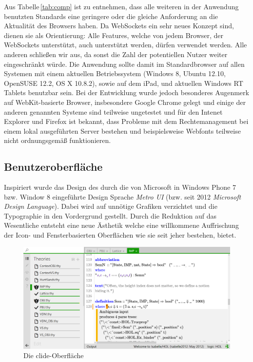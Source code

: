Aus Tabelle\,\ref{tab:comp} ist zu entnehmen, dass alle weiteren in der Anwendung benutzten
Standards eine geringere oder die gleiche Anforderung an die Aktualität des Browsers haben. Da
WebSockets ein sehr neues Konzept sind,  dienen sie als Orientierung: Alle Features, welche von
jedem Browser, der WebSockets unterstützt, auch unterstützt werden, dürfen verwendet werden. Alle
anderen schließen wir aus, da sonst die Zahl der potentiellen Nutzer weiter eingeschränkt würde. Die
Anwendung sollte damit im Standardbrowser auf allen Systemen mit einem aktuellen Betriebssystem
(Windows 8, Ubuntu 12.10, OpenSUSE 12.2, OS X 10.8.2), sowie auf dem iPad, und aktuellen Windows RT
Tablets benutzbar sein. Bei der Entwicklung wurde jedoch besonderes Augenmerk auf WebKit-basierte
Browser, insbesondere Google Chrome gelegt und einige der anderen genannten Systeme sind teilweise
ungetestet und für den Intenet Explorer und Firefox ist bekannt, dass Probleme mit dem
Rechtemanagement bei einem lokal ausgeführten Server bestehen und beispielsweise Webfonts teilweise
nicht ordnungsgemäß funktionieren.

\subsection{Benutzeroberfläche}

Inspiriert wurde das Design des  durch die von Microsoft in Windows Phone 7 bzw. Window 8
eingeführte Design Sprache \textit{Metro UI} (bzw. seit 2012 \textit{Microsoft Design Language}).
\cite{metroui} Dabei wird auf unnötige Grafiken verzichtet und die Typographie in den Vordergrund
gestellt. Durch die Reduktion auf das Wesentliche entsteht eine neue Ästhetik welche eine
willkommene Auffrischung der Icon- und Fensterbasierten Oberflächen wie sie seit jeher bestehen,
bietet.

\begin{figure}[ht]
\includegraphics[width=\linewidth]{images/screen-main}
  \caption{Die clide-Oberfläche}
  \label{fig:screen-main}
\end{figure}

